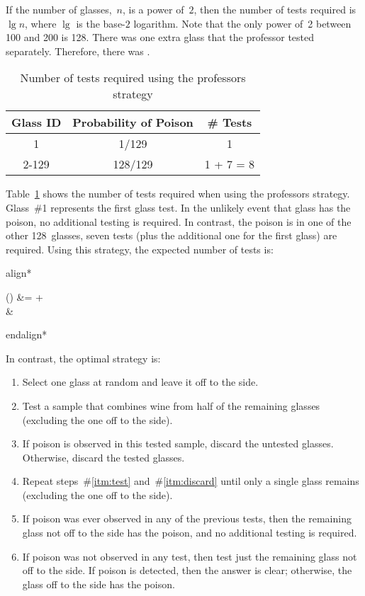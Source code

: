 \documentclass{report}
\newenvironment{aligncustom}
{ \csname align*\endcsname %
    \centering
}
{
  \csname endalign*\endcsname
}
\begin{document}
  If the number of glasses,~$n$, is a power of~$2$, then the number of tests required is $\lg n$, where $\lg$ is the base-$2$ logarithm.  Note that the only power of~2 between 100 and 200 is 128.  There was one extra glass that the professor tested separately.  Therefore, there was .

  \begin{table}[h]
    \centering
    \begin{tabular}{c|c|c}
      \hline
      Glass ID & Probability of Poison & \# Tests  \\\hline
      1        & 1/129                 & 1         \\\hline
      2-129    & 128/129               & 1 + 7 = 8 \\\hline
    \end{tabular}
    \caption{Number of tests required using the professors strategy}\label{tab:problem5.9.20-Prof}
  \end{table}

  Table~\ref{tab:problem5.9.20-Prof} shows the number of tests required when using the professors strategy.  Glass~\#1 represents the first glass test.  In the unlikely event that glass has the poison, no additional testing is required. In contrast, the poison is in one of the other 128~glasses, seven tests (plus the additional one for the first glass) are required.  Using this strategy, the expected number of tests is:

  \begin{aligncustom}
    () &=   +   \\
                                            &\approx {}
  \end{aligncustom}


  In contrast, the optimal strategy is:

  \begin{enumerate}
    \item Select one glass at random and leave it off to the side.
    \item\label{itm:test} Test a sample that combines wine from half of the remaining glasses (excluding the one off to the side).
    \item\label{itm:discard} If poison is observed in this tested sample, discard the untested glasses.  Otherwise, discard the tested glasses.
    \item Repeat steps~\#\ref{itm:test} and~\#\ref{itm:discard} until only a single glass remains (excluding the one off to the side).
    \item If poison was ever observed in any of the previous tests, then the remaining glass not off to the side has the poison, and no additional testing is required.
    \item\label{itm:testRemaining} If poison was not observed in any test, then test just the remaining glass not off to the side. If poison is detected, then the answer is clear; otherwise, the glass off to the side has the poison.
  \end{enumerate}
\end{document}
